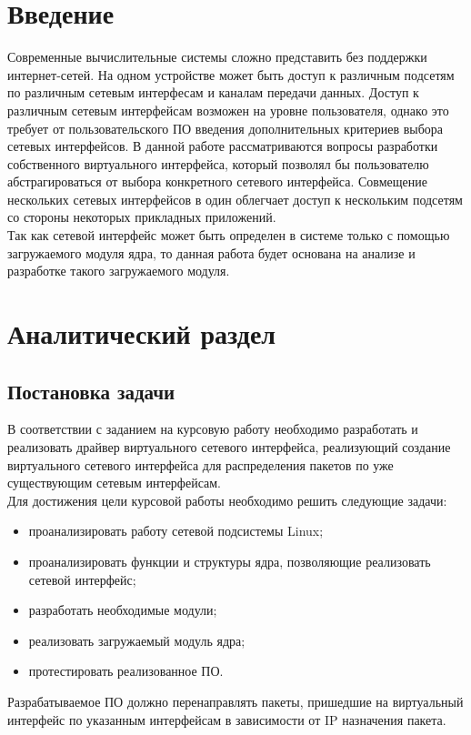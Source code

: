 \documentclass[14pt, a4paper]{extarticle}
\begin{document}


\setcounter{page}{3}

\clearpage
\tableofcontents

\clearpage
\section*{Введение}


	Современные вычислительные системы сложно представить без поддержки интернет-сетей. На одном устройстве может быть доступ к различным подсетям по различным сетевым интерфесам и каналам передачи данных. Доступ к различным сетевым интерфейсам возможен на уровне пользователя, однако это требует от пользовательского ПО введения дополнительных критериев выбора сетевых интерфейсов. В данной работе рассматриваются вопросы разработки собственного виртуального интерфейса, который позволял бы пользователю абстрагироваться от выбора конкретного сетевого интерфейса. Совмещение нескольких сетевых интерфейсов в один облегчает доступ к нескольким подсетям со стороны некоторых прикладных приложений.\\
\indent Так как сетевой интерфейс может быть определен в системе только с помощью загружаемого модуля ядра, то данная работа будет основана на анализе и разработке такого загружаемого модуля.


\clearpage
\section{Аналитический раздел}
\subsection{Постановка задачи}
В соответствии с заданием на курсовую работу необходимо разработать
и реализовать драйвер виртуального сетевого интерфейса, реализующий создание виртуального сетевого интерфейса для распределения пакетов по уже существующим сетевым интерфейсам. \\
\indent Для достижения цели курсовой работы необходимо решить следующие задачи:
\begin{itemize}
	\item проанализировать работу сетевой подсистемы Linux;
	\item проанализировать функции и структуры ядра, позволяющие реализовать сетевой интерфейс;
	\item разработать необходимые модули;
	\item реализовать загружаемый модуль ядра;
	\item протестировать реализованное ПО.
\end{itemize}
\indent \indent Разрабатываемое ПО должно перенаправлять пакеты, пришедшие на виртуальный интерфейс по указанным интерфейсам в зависимости от IP назначения пакета.
\end{document}
